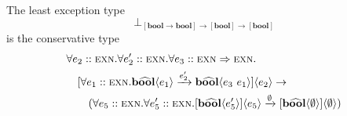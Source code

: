 \documentclass{llncs}
\newcommand{\Throws}[2]{#1\langle #2\rangle}    %
\newcommand{\ExnTyBool}{\mathrm{b\widehat{oo}l}}    %
\newcommand{\ExnTyList}[2]{\left[\Throws{#1}{#2}\right]\!}
\newcommand{\ExnTyForall}[3]{\forall #1 :: #2. #3}
\newcommand{\ExnVar}{e}
\newcommand{\ExnEmpty}{\emptyset}
\newcommand{\ExnBool}{\mathbf{b\widehat{oo}l}}      %
\newcommand{\KindEXN}{\textsc{exn}}
\newcommand{\KindArr}{\Rightarrow}
\newcommand{\TyBool}{\mathbf{bool}}
\newcommand{\TyList}[1]{\left[#1\right]}
\newcommand{\TyArr}[2]{#1 \to #2}
\begin{document}
\begin{example} The least exception type \[ \bot_{\TyArr{\TyList{\TyArr{\TyBool}{\TyBool}}}{\TyArr{\TyList{\TyBool}}{\TyList{\TyBool}}}} \] is the conservative type
    \begin{align*}
        &    {\ExnTyForall{\ExnVar_2}{\KindEXN}{\ExnTyForall{\ExnVar_2^\prime}{\KindEXN}{\ExnTyForall{\ExnVar_3}{\KindEXN\KindArr\KindEXN}{}}}} \\
        & \quad \Throws{[\ExnTyForall{\ExnVar_1}{\KindEXN}{\Throws{\ExnBool}{\ExnVar_1}\xrightarrow{\ExnVar_2^\prime}\Throws{\ExnBool}{\ExnVar_3\ \ExnVar_1}}]}{\ExnVar_2} \to \\
        & \quad\quad (\ExnTyForall{\ExnVar_5}{\KindEXN}{\ExnTyForall{\ExnVar_5^\prime}{\KindEXN}{\Throws{[\Throws{\ExnBool}{\ExnVar_5^\prime}]}{\ExnVar_5}}} \xrightarrow{\ExnEmpty} \Throws{\ExnTyList{\ExnBool}{\ExnEmpty}}{\ExnEmpty})
    \end{align*}
\end{example}
\end{document}

